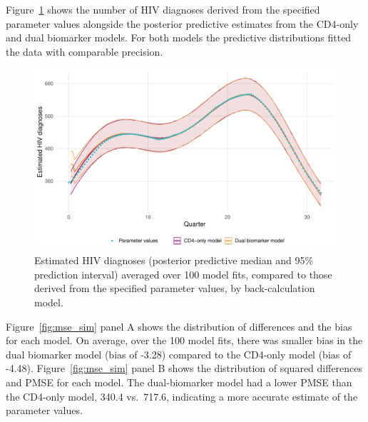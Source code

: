 Figure~\ref{fig:diag_fit_sim} shows the number of HIV diagnoses derived from the specified parameter values alongside the posterior predictive estimates from the CD4-only and dual biomarker models. For both models the predictive distributions fitted the data with comparable precision.

\begin{figure}[htbp!]
  \centering
  \includegraphics[width=\textwidth]{diag_fit_sim.pdf}
  \caption[Estimated HIV diagnoses (posterior predictive median and 95\% prediction interval), by back-calculation model]{Estimated HIV diagnoses (posterior predictive median and 95\% prediction interval) averaged over 100 model fits, compared to those derived from the specified parameter values, by back-calculation model.}\label{fig:diag_fit_sim}
\end{figure}

Figure~\ref{fig:mse_sim} panel A shows the distribution of differences and the bias for each model. On average, over the 100 model fits, there was smaller bias in the dual biomarker model (bias of -3.28) compared to the CD4-only model (bias of -4.48). Figure~\ref{fig:mse_sim} panel B shows the distribution of squared differences and PMSE for each model. The dual-biomarker model had a lower PMSE than the CD4-only model, 340.4 vs.\ 717.6, indicating a more accurate estimate of the parameter values.

